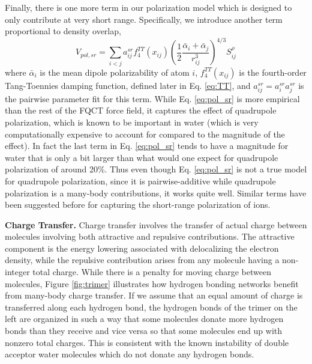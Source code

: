 \documentclass[journal=jctcce,manuscript=article]{achemso}
\begin{document}
Finally, there is one more term in our polarization model which is designed to only contribute at very
short range. Specifically, we introduce another term proportional to density overlap,
\begin{equation}
  V_{pol,sr}=\sum_{i<j}a_{ij}^{sr}f_4^{TT}(x_{ij})\left(\frac{1}{2}\frac{\bar{\alpha}_i + \bar{\alpha}_j}{r_{ij}^3}\right)^{4/3}S_{ij}^{\rho}
\label{eq:pol_sr}
\end{equation}
where $\bar{\alpha}_i$ is the mean dipole polarizability of atom $i$, $f_4^{TT}(x_{ij})$
is the fourth-order Tang-Toennies damping function, defined later in Eq. \ref{eq:TT}, and $a_{ij}^{sr}=a_{i}^{sr}a_{j}^{sr}$ is
the pairwise parameter fit for this term. While Eq. \ref{eq:pol_sr} is more empirical than the rest of the FQCT force field, it captures the effect of quadrupole polarization, which is known to be important
in water\cite{herman2023accurate} (which is very computationally expensive to account for compared to the magnitude of the effect). In fact the last term in Eq. \ref{eq:pol_sr} tends to have a magnitude for water
that is only a bit larger than what would one expect for quadrupole polarization of around 20\%. Thus even though Eq. \ref{eq:pol_sr} is 
not a true model for quadrupole polarization, since it is pairwise-additive
while quadrupole polarization is a many-body contributions, it works quite well. Similar terms
have been suggested before for capturing the short-range polarization of ions.\cite{sheng2022semiempirical}

\textbf{Charge Transfer.} Charge transfer involves the transfer of actual charge between molecules\cite{thirman2018characterizing} involving both attractive and repulsive contributions. The attractive component is the energy lowering associated with delocalizing
the electron density, while the repulsive contribution arises from any molecule having a non-integer total charge. While there is a penalty for moving charge between molecules, Figure \ref{fig:trimer} illustrates how hydrogen bonding networks benefit from many-body charge transfer. If we assume that an equal amount of charge is transferred along each hydrogen bond, the hydrogen bonds of the trimer on the left are organized in such a way that some molecules donate more hydrogen bonds than they receive and vice versa so that some molecules end up with nonzero total charges. This is consistent with the known instability of double acceptor water molecules which do not donate any hydrogen bonds.\cite{kirov2008identifying}
\end{document}
